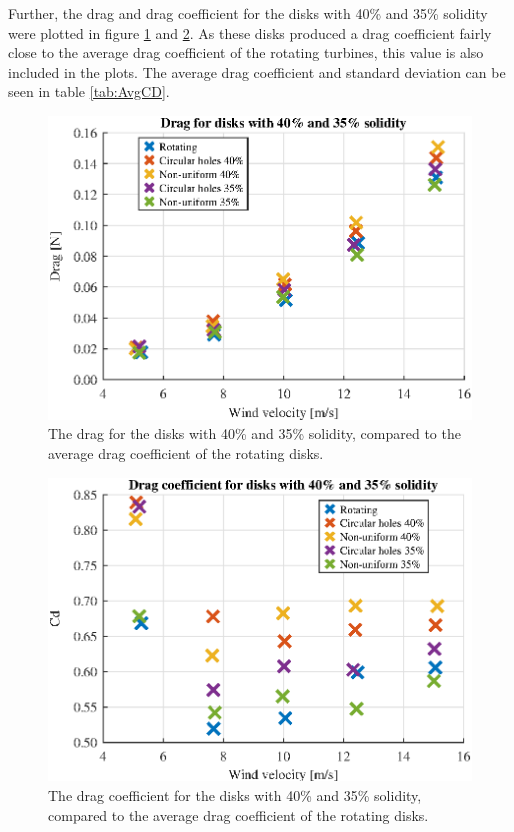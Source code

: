 Further, the drag and drag coefficient for the disks with 40\% and 35\% solidity were plotted in figure \ref{fig:FortyDrag} and \ref{fig:FortyCD}. As these disks produced a drag coefficient fairly close to the average drag coefficient of the rotating turbines, this value is also included in the plots. The average drag coefficient and standard deviation can be seen in table \ref{tab:AvgCD}. 

\begin{figure}[h!]
    \centering
    \includegraphics[width=\linewidth]{0_Images/FortyDrag.eps}
    \caption{The drag for the disks with 40\% and 35\% solidity, compared to the average drag coefficient of the rotating disks.}
    \label{fig:FortyDrag}
\end{figure}

\begin{figure}[h!]
    \centering
    \includegraphics[width=\linewidth]{0_Images/FortyCD.eps}
    \caption{The drag coefficient for the disks with 40\% and 35\% solidity, compared to the average drag coefficient of the rotating disks.}
    \label{fig:FortyCD}
\end{figure}



